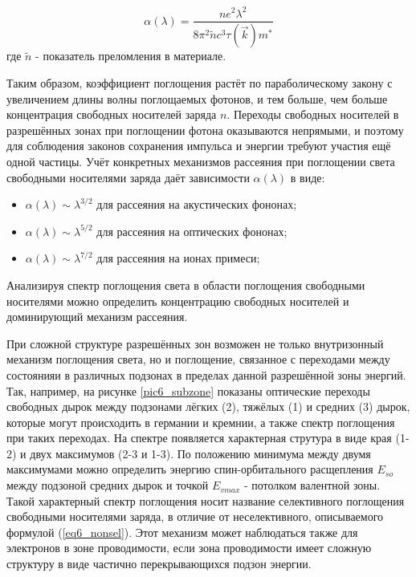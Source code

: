 \begin{equation}
\alpha(\lambda) = \frac{n e^2 \lambda^2}{8 \pi^2 \tilde{n} c^3 \tau(\overrightarrow{k}) m^{*}}
\label{eq6_nonsel}
\end{equation}
где $\tilde{n}$ - показатель преломления в материале.

Таким образом, коэффициент поглощения растёт по параболическому закону с увеличением длины волны поглощаемых фотонов, и тем больше, чем больше концентрация свободных носителей заряда $n$. Переходы свободных носителей в разрешённых зонах при поглощении фотона оказываются непрямыми, и поэтому для соблюдения законов сохранения импульса и энергии требуют участия ещё одной частицы. Учёт конкретных механизмов рассеяния при поглощении света свободными носителями заряда даёт зависимости $\alpha(\lambda)$ в виде:

\begin{itemize}
\item $\alpha(\lambda) \sim \lambda^{3/2}$ для рассеяния на акустических фононах;
\item $\alpha(\lambda) \sim \lambda^{5/2}$ для рассеяния на оптических фононах;
\item $\alpha(\lambda) \sim \lambda^{7/2}$ для рассеяния на ионах примеси;
\end{itemize}

Анализируя спектр поглощения света в области поглощения свободными носителями можно определить концентрацию свободных носителей и доминирующий механизм рассеяния.

При сложной структуре разрешённых зон возможен не только внутризонный механизм поглощения света, но и поглощение, связанное с переходами между состоянияи в различных подзонах в пределах данной разрешённой зоны энергий. Так, например, на рисунке \ref{pic6_subzone} показаны оптические переходы свободных дырок между подзонами лёгких (2), тяжёлых (1) и средних (3) дырок, которые могут происходить в германии и кремнии, а также спектр поглощения при таких переходах. На спектре появляется характерная струтура в виде края (1-2) и двух максимумов (2-3 и 1-3). По положению минимума между двумя максимумами можно определить энергию спин-орбитального расщепления $E_{so}$ между подзоной средних дырок и точкой $E_{v max}$ - потолком валентной зоны. Такой характерный спектр поглощения носит название селективного поглощения свободными носителями заряда, в отличие от неселективного, описываемого формулой (\ref{eq6_nonsel}). Этот механизм может наблюдаться также для электронов в зоне проводимости, если зона проводимости имеет сложную структуру в виде частично перекрывающихся подзон энергии.

